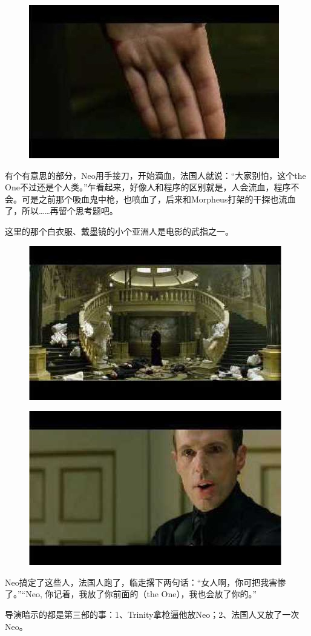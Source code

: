 \documentclass{ctexart}
\begin{document}
\begin{figure}[htb]
\centering
\includegraphics[width=0.5\linewidth]{fig/read_reloaded-123-2}
\end{figure}

有个有意思的部分，Neo用手接刀，开始滴血，法国人就说：“大家别怕，这个the One不过还是个人类。”乍看起来，好像人和程序的区别就是，人会流血，程序不会。可是之前那个吸血鬼中枪，也喷血了，后来和Morpheus打架的干探也流血了，所以……再留个思考题吧。

这里的那个白衣服、戴墨镜的小个亚洲人是电影的武指之一。

\begin{figure}[htb]
\centering
\includegraphics[width=0.5\linewidth]{fig/read_reloaded-124}
\end{figure}

\begin{figure}[htb]
\centering
\includegraphics[width=0.5\linewidth]{fig/read_reloaded-125}
\end{figure}

Neo搞定了这些人，法国人跑了，临走撂下两句话：“女人啊，你可把我害惨了。”“Neo, 你记着，我放了你前面的（the One），我也会放了你的。”

导演暗示的都是第三部的事：1、Trinity拿枪逼他放Neo；2、法国人又放了一次Neo。
\end{document}
